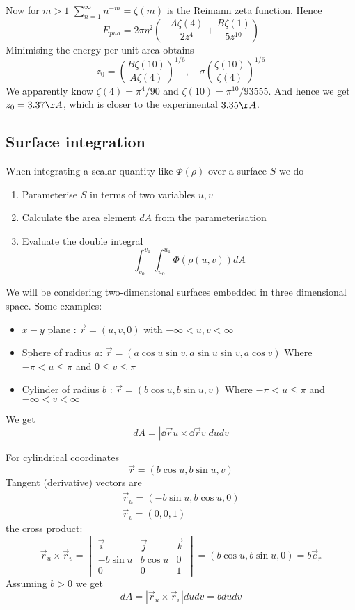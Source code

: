 \documentclass{X:/Documents/Coding/Latex/myassignment}
\begin{document}
Now for $m>1$ $\sum_{n=1}^\infty n^{-m} = \zeta(m)$ is the Reimann zeta function. Hence
\[E_{pua} = 2\pi\eta^2 \left(- \frac{A\zeta(4)}{2z^4} + \frac{B\zeta(1)}{5z^{10}}\right)\] 
Minimising the energy per unit area obtains
\[z_0 = \left(\frac{B\zeta(10)}{A\zeta(4)}\right)^{1/6}, \quad \sigma \left(\frac{\zeta(10)}{\zeta(4)}\right)^{1/6}\]
We apparently know $\zeta(4) = \pi^4/90$ and $\zeta(10) = \pi^{10}/93555$.
And hence we get $z_0 = 3.37 \AA$, which is closer to the experimental $3.35\AA$.

\subsection{Surface integration}
When integrating a scalar quantity like $\Phi(\rho)$ over a surface $S$ we do
\begin{enumerate}
	\item Parameterise $S$ in terms of two variables $u,v$
	\item Calculate the area element $dA$ from the parameterisation
	\item Evaluate the double integral
	\[\int_{v_0}^{v_1} \int_{u_0}^{u_1} \Phi(\rho(u,v)) dA\]
\end{enumerate}

We will be considering two-dimensional surfaces embedded in three dimensional space. Some examples:
\begin{itemize}
	\item $x-y$ plane : $\vec r = (u,v,0)$ with $-\infty < u,v < \infty$
	\item Sphere of radius $a$: $\vec r =(a\cos u \sin v, a\sin u \sin v, a \cos v)$
	Where $-\pi < u \leq \pi$ and $0\leq v \leq \pi$
	\item Cylinder of radius $b$ : $\vec r = (b\cos u, b\sin u,v)$
	Where $-\pi < u \leq \pi$ and $-\infty < v < \infty$
\end{itemize}

We get
\[dA = \left|\dd{\vec r}{u} \times \dd{\vec r}{v}\right| du dv\]


For cylindrical coordinates
\[\vec r = (b\cos u, b \sin u, v)\]
Tangent (derivative) vectors are 
\begin{align*}
	\vec r_u = (-b\sin u, b\cos u,0)\\
	\vec r_v = (0,0,1)
\end{align*}
the cross product:
\[\vec r_u \times \vec r_v = \begin{vmatrix}
	\vec i&\vec j&\vec k\\
	-b\sin u &b \cos u & 0\\
	0&0&1
\end{vmatrix} = (b\cos u, b\sin u,0) = b\vec e_r\]
Assuming $b>0$ we get
\[dA = |\vec r_u \times \vec r_v| du dv = b du dv\]
\end{document}
